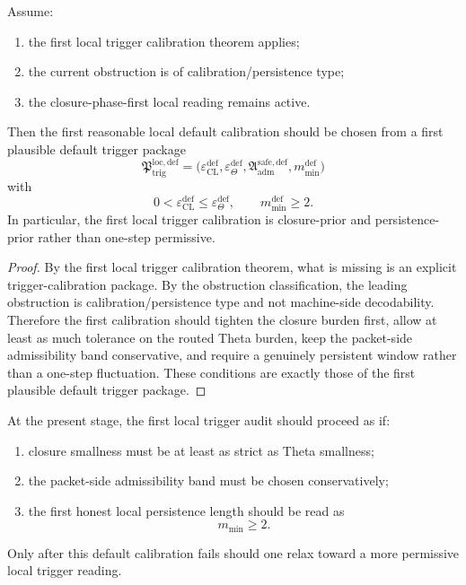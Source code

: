 \begin{theorem}
\label{thm:first-default-local-trigger-calibration-theorem}
Assume:
\begin{enumerate}
 \item the first local trigger calibration theorem applies;
 \item the current obstruction is of calibration/persistence type;
 \item the closure-phase-first local reading remains active.
\end{enumerate}
Then the first reasonable local default calibration should be chosen from a first plausible default trigger package
\[
\mathfrak{P}_{\mathrm{trig}}^{\mathrm{loc,def}}
=
\bigl(
\varepsilon_{\mathrm{CL}}^{\mathrm{def}},
\varepsilon_{\Theta}^{\mathrm{def}},
\mathfrak{A}_{\mathrm{adm}}^{\mathrm{safe,def}},
 m_{\min}^{\mathrm{def}}
\bigr)
\]
with
\[
0<\varepsilon_{\mathrm{CL}}^{\mathrm{def}} \le \varepsilon_{\Theta}^{\mathrm{def}},
\qquad
m_{\min}^{\mathrm{def}}\ge 2.
\]
In particular, the first local trigger calibration is closure-prior and persistence-prior rather than one-step permissive.
\end{theorem}

\begin{proof}
By the first local trigger calibration theorem, what is missing is an explicit trigger-calibration package.
By the obstruction classification, the leading obstruction is calibration/persistence type and not machine-side decodability.
Therefore the first calibration should tighten the closure burden first, allow at least as much tolerance on the routed Theta burden, keep the packet-side admissibility band conservative, and require a genuinely persistent window rather than a one-step fluctuation.
These conditions are exactly those of the first plausible default trigger package.
\end{proof}

\begin{corollary}
\label{cor:current-post-r15-default-working-rule}
At the present stage, the first local trigger audit should proceed as if:
\begin{enumerate}
 \item closure smallness must be at least as strict as Theta smallness;
 \item the packet-side admissibility band must be chosen conservatively;
 \item the first honest local persistence length should be read as
 \[
 m_{\min}\ge 2.
 \]
\end{enumerate}
Only after this default calibration fails should one relax toward a more permissive local trigger reading.
\end{corollary}

